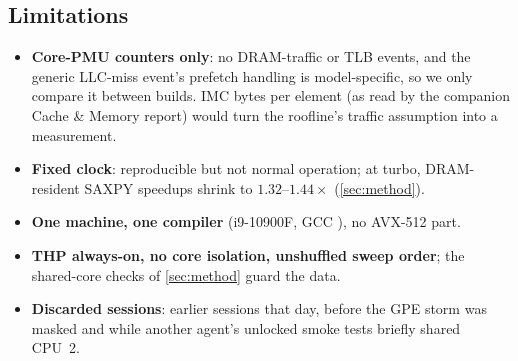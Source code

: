 \subsection{Limitations}
\begin{itemize}
  \item \textbf{Core-PMU counters only}: no DRAM-traffic or TLB events, and the generic LLC-miss
        event's prefetch handling is model-specific, so we only compare it between builds. IMC bytes
        per element (as read by the companion Cache \& Memory report) would turn the roofline's
        traffic assumption into a measurement.
  \item \textbf{Fixed clock}: reproducible but not normal operation; at turbo, DRAM-resident SAXPY
        speedups shrink to $1.32\text{--}1.44\times$ (\cref{sec:method}).
  \item \textbf{One machine, one compiler} (i9-10900F, GCC \sysGCC{}), no AVX-512 part.
  \item \textbf{THP always-on, no core isolation, unshuffled sweep order}; the shared-core checks of
        \cref{sec:method} guard the data.
  \item \textbf{Discarded sessions}: earlier sessions that day, before the GPE storm was masked and
        while another agent's unlocked smoke tests briefly shared CPU~2.
\end{itemize}
